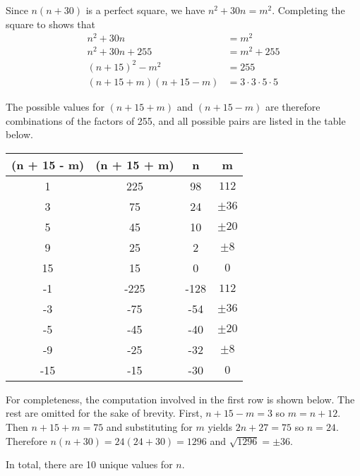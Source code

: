 \documentclass[letterpaper]{article}
\begin{document}
\begin{itemize}
            Since \(n(n+30)\) is a perfect square, we have \(n^2 + 30n = m^2\).
            Completing the square to shows that \begin{align*}
                  n^2 + 30n             & = m^2                     \\
                  n^2 + 30n + 255       & = m^2 + 255               \\
                  (n+15)^2 - m^2        & = 255                     \\
                  (n + 15 + m )(n+15-m) & = 3\cdot 3\cdot 5 \cdot 5
            \end{align*}

            The possible values for \((n + 15 + m )\) and \((n+15-m)\) are therefore combinations of the factors of 255, and all possible pairs are listed in the table below.

            \begin{center}
                  \begin{tabular}{c|c|c|c}
                        (n + 15 - m) & (n + 15 + m) & n    & m          \\ [1ex]
                        \hline
                        1            & 225          & 98   & \(112\)    \\
                        3            & 75           & 24   & \(\pm 36\) \\
                        5            & 45           & 10   & \(\pm 20\) \\
                        9            & 25           & 2    & \(\pm 8\)  \\
                        15           & 15           & 0    & \(0\)      \\
                        -1           & -225         & -128 & \(112\)    \\
                        -3           & -75          & -54  & \(\pm 36\) \\
                        -5           & -45          & -40  & \(\pm 20\) \\
                        -9           & -25          & -32  & \(\pm 8\)  \\
                        -15          & -15          & -30  & \(0\)      \\
                  \end{tabular}
            \end{center}
            For completeness, the computation involved in the first row is shown below. The rest are omitted for the sake of brevity. First, \(n + 15 - m = 3\) so \(m = n + 12\). Then \(n + 15 + m = 75\) and substituting for \(m\) yields \(2n + 27 = 75\) so \(n = 24\). Therefore \(n(n+30) = 24(24 + 30) = 1296\) and \(\sqrt{1296} = \pm 36\).

            In total, there are 10 unique values for \(n\).


\end{itemize}
\end{document}

